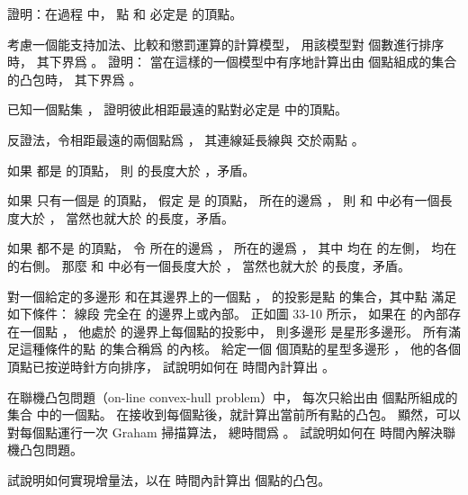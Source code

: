 \startsection[
  title={Finding the convex hull},
]

\startEXERCISE
證明：在過程  中，
點  和  必定是  的頂點。
\stopEXERCISE

\startANSWER
{}
\stopANSWER

\startEXERCISE
考慮一個能支持加法、比較和懲罰運算的計算模型，
用該模型對  個數進行排序時，
其下界爲 。
證明：
當在這樣的一個模型中有序地計算出由  個點組成的集合的凸包時，
其下界爲 。
\stopEXERCISE

\startANSWER
{}
\stopANSWER

\startEXERCISE
已知一個點集 ，
證明彼此相距最遠的點對必定是  中的頂點。
\stopEXERCISE

\startANSWER
反證法，令相距最遠的兩個點爲 ，
其連線延長線與  交於兩點 。

如果  都是  的頂點，
則  的長度大於 ，矛盾。

如果  只有一個是  的頂點，
假定  是  的頂點，
  所在的邊爲 ，
則  和  中必有一個長度大於 ，
當然也就大於  的長度，矛盾。

如果  都不是  的頂點，
令  所在的邊爲 ，
  所在的邊爲 ，
其中  均在  的左側，
  均在  的右側。
那麼  和  中必有一個長度大於 ，
當然也就大於  的長度，矛盾。
\stopANSWER

\startEXERCISE
對一個給定的多邊形  和在其邊界上的一個點 ，
  的{\EMP 投影}是點  的集合，其中點  滿足如下條件：
線段  完全在  的邊界上或內部。
正如圖 33-10 所示，
如果在  的內部存在一個點 ，
他處於  的邊界上每個點的投影中，
則多邊形  是{\EMP 星形多邊形}。
所有滿足這種條件的點  的集合稱爲  的{\EMP 內核}。
給定一個  個頂點的星型多邊形 ，
他的各個頂點已按逆時針方向排序，
試說明如何在  時間內計算出 。
\stopEXERCISE

\startANSWER
{}
\stopANSWER

\startEXERCISE
在{\EMP 聯機凸包問題}（on-line convex-hull problem）中，
每次只給出由  個點所組成的集合  中的一個點。
在接收到每個點後，就計算出當前所有點的凸包。
顯然，可以對每個點運行一次 Graham 掃描算法，
總時間爲 。
試說明如何在  時間內解決聯機凸包問題。
\stopEXERCISE

\startANSWER
{}
\stopANSWER

\startEXERCISE\DIFFICULT
試說明如何實現增量法，以在  時間內計算出  個點的凸包。
\stopEXERCISE

\startANSWER
{}
\stopANSWER

\stopsection
